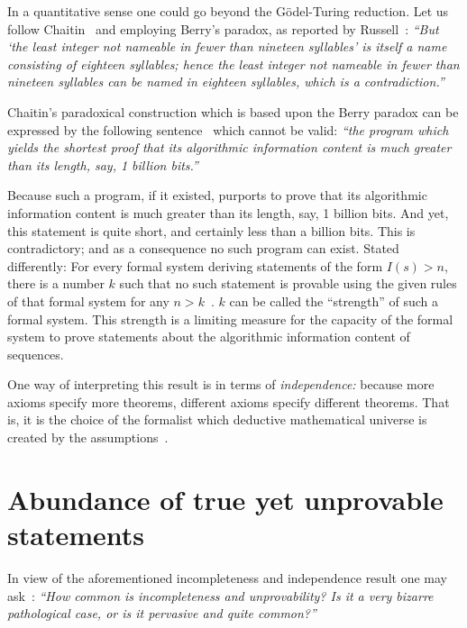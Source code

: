In a quantitative sense one could go beyond the G\"odel-Turing reduction.
Let us follow Chaitin~\cite{Chaitin-1974} and employing Berry's paradox,
as reported by Russell~\cite[p.~153, contradiction~(4), footnote~3]{Heijenoort-fftg}:
{\em  ``But `the least
integer not nameable in fewer than nineteen syllables' is itself a name consisting of
eighteen syllables; hence the least integer not nameable in fewer than nineteen
syllables can be named in eighteen syllables, which is a contradiction.''}

Chaitin's paradoxical construction which is based upon the Berry paradox can be expressed by the following sentence~\cite{Chaitin-1974,chaitin-ait-82-handbook}
which cannot be valid:
{\em ``the program which yields the shortest proof that its algorithmic information content is much greater than its length, say, 1 billion bits.''}

Because such a program, if it existed, purports to prove that its algorithmic information content is much greater than its length, say, 1 billion bits.
And yet, this statement is quite short, and certainly less than a billion bits.
This is contradictory; and as a consequence no such program can exist.
Stated differently:
For every formal system deriving statements of the form $I(s) > n$, there is a number $k$
such that no such statement is provable using the given rules of that formal system  for any $n > k$~\cite[p~265,266]{Davis1978}.
$k$ can be called the ``strength'' of such a formal system.
This strength is a limiting measure for the capacity of the formal system to prove statements about the algorithmic information content of sequences.

One way of interpreting this result is in terms of {\em independence:}
because more axioms specify more theorems, different axioms specify different theorems.
That is, it is the choice of the formalist which deductive mathematical universe is created by the assumptions~\cite[p.~38]{Hazewinkel-e5}.

\section{Abundance of true yet unprovable statements}
\label{2016-pu-book-chapter-ranform-rp}

In view of the aforementioned incompleteness and independence result
one may ask~\cite[p.~148]{chaitin:92}: {\em ``How common is incompleteness and unprovability? Is
it a very bizarre pathological case, or is it pervasive and quite common?''}

